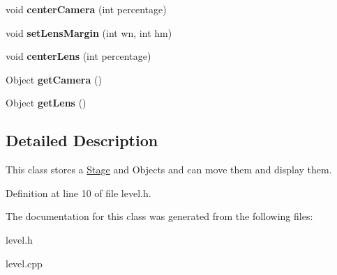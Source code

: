 \begin{DoxyCompactItemize}
\item 
void {\bfseries center\+Camera} (int percentage)\hypertarget{classLevel_ae2df583cad2a4bbda86e4043d4b81a70}{}\label{classLevel_ae2df583cad2a4bbda86e4043d4b81a70}

\item 
void {\bfseries set\+Lens\+Margin} (int wn, int hm)\hypertarget{classLevel_a72667cfc3b4e98433f4faac78e30e83e}{}\label{classLevel_a72667cfc3b4e98433f4faac78e30e83e}

\item 
void {\bfseries center\+Lens} (int percentage)\hypertarget{classLevel_ac39dbca241ee739f5f9c2a750c3750f4}{}\label{classLevel_ac39dbca241ee739f5f9c2a750c3750f4}

\item 
Object {\bfseries get\+Camera} ()\hypertarget{classLevel_a11a17dbe04938950421d001a8f94cbbc}{}\label{classLevel_a11a17dbe04938950421d001a8f94cbbc}

\item 
Object {\bfseries get\+Lens} ()\hypertarget{classLevel_a33bd74850ef322de8d76572f9fea312f}{}\label{classLevel_a33bd74850ef322de8d76572f9fea312f}

\end{DoxyCompactItemize}


\subsection{Detailed Description}
This class stores a \hyperlink{classStage}{Stage} and Objects and can move them and display them. 

Definition at line 10 of file level.\+h.



The documentation for this class was generated from the following files\+:\begin{DoxyCompactItemize}
\item 
level.\+h\item 
level.\+cpp\end{DoxyCompactItemize}
